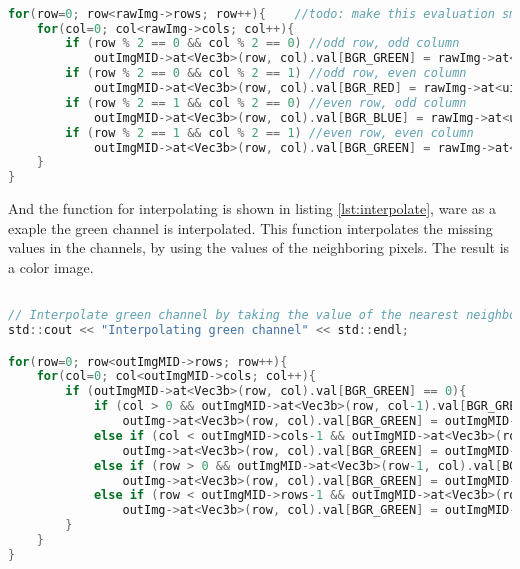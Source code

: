 \begin{lstlisting}[language=C, caption=splitt image, label=lst:splitt]

for(row=0; row<rawImg->rows; row++){	//todo: make this evaluation smaller to increase speed
    for(col=0; col<rawImg->cols; col++){
        if (row % 2 == 0 && col % 2 == 0) //odd row, odd column
            outImgMID->at<Vec3b>(row, col).val[BGR_GREEN] = rawImg->at<uint8_t>(row,col);
        if (row % 2 == 0 && col % 2 == 1) //odd row, even column
            outImgMID->at<Vec3b>(row, col).val[BGR_RED] = rawImg->at<uint8_t>(row,col);
        if (row % 2 == 1 && col % 2 == 0) //even row, odd column
            outImgMID->at<Vec3b>(row, col).val[BGR_BLUE] = rawImg->at<uint8_t>(row,col);
        if (row % 2 == 1 && col % 2 == 1) //even row, even column
            outImgMID->at<Vec3b>(row, col).val[BGR_GREEN] = rawImg->at<uint8_t>(row,col);			
    }
}

\end{lstlisting}

And the function for interpolating is shown in listing \ref{lst:interpolate}, ware as a exaple the green channel is interpolated.
This function interpolates the missing values in the channels, by using the values of the neighboring pixels. The result is a color image.

\begin{lstlisting}[language=C, caption=interpolate missing values, label=lst:interpolate]

// Interpolate green channel by taking the value of the nearest neighbour that is green
std::cout << "Interpolating green channel" << std::endl;

for(row=0; row<outImgMID->rows; row++){
    for(col=0; col<outImgMID->cols; col++){
        if (outImgMID->at<Vec3b>(row, col).val[BGR_GREEN] == 0){
            if (col > 0 && outImgMID->at<Vec3b>(row, col-1).val[BGR_GREEN] != 0)
                outImg->at<Vec3b>(row, col).val[BGR_GREEN] = outImgMID->at<Vec3b>(row, col-1).val[BGR_GREEN];
            else if (col < outImgMID->cols-1 && outImgMID->at<Vec3b>(row, col+1).val[BGR_GREEN] != 0)
                outImg->at<Vec3b>(row, col).val[BGR_GREEN] = outImgMID->at<Vec3b>(row, col+1).val[BGR_GREEN];
            else if (row > 0 && outImgMID->at<Vec3b>(row-1, col).val[BGR_GREEN] != 0)
                outImg->at<Vec3b>(row, col).val[BGR_GREEN] = outImgMID->at<Vec3b>(row-1, col).val[BGR_GREEN];
            else if (row < outImgMID->rows-1 && outImgMID->at<Vec3b>(row+1, col).val[BGR_GREEN] != 0)
                outImg->at<Vec3b>(row, col).val[BGR_GREEN] = outImgMID->at<Vec3b>(row+1, col).val[BGR_GREEN];
        }
    }
}

\end{lstlisting}

